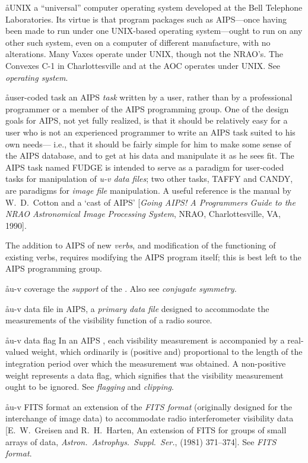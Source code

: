 \aa{UNIX}
a ``universal'' computer operating system developed at the Bell
Telephone Laboratories.  Its virtue is that program packages
such as AIPS---once having been made to run under one UNIX-based
operating system---ought to run on any other such system, even
on a computer of different manufacture, with no alterations.
Many Vaxes operate under UNIX, though not the NRAO's.
The Convexes C-1 in Charlottesville and at the AOC operates under
UNIX.
See {\it operating system}.

\aa{user-coded task}
an AIPS {\it task} written by a user, rather than by a professional
programmer or a member of the AIPS programming group.
One of the design goals for AIPS, not yet fully realized, is that
it should be relatively easy for a user
who is not an experienced programmer to write an AIPS task
suited to his own needs---%
i.e., that it should be fairly simple for him to make some
sense of the AIPS database, and to get at his data and manipulate
it as he sees fit.
The AIPS task named FUDGE is intended to serve as a paradigm
for user-coded tasks for manipulation of {\it u-v data files};
two other tasks, TAFFY and CANDY, are paradigms for
{\it image file} manipulation.
A useful reference is the manual by W.~D.~Cotton and a `cast of AIPS'
[{\it Going AIPS! A Programmers Guide to the NRAO Astronomical
Image Processing System}\/, NRAO, Charlottesville, VA, 1990].
\par
The addition to AIPS of new {\it verbs}\/,
and modification of the functioning of existing verbs,
requires modifying the AIPS program itself;
this is best left to the AIPS programming group.

\aa{u-v coverage}
the {\it support} of the  \qv.
Also see {\it conjugate symmetry.}

\aa{u-v data file}
in AIPS, a {\it primary data file} designed to accommodate  the measurements
of the visibility function of a radio source.

\aa{u-v data flag}
In an AIPS , each visibility measurement is accompanied
by a real-valued weight, which ordinarily is (positive and)
proportional to the length
of the integration period over which the measurement was obtained.
A non-positive weight represents a \uv data flag,
which signifies that the visibility measurement ought to be ignored.
See {\it flagging} and {\it clipping}.

\aa{u-v FITS format}
an extension of the {\it FITS format} (originally designed for the
interchange of image data)
to accommodate radio interferometer visibility data
[E.~W.~Greisen and R.~H.~Harten,
An extension of FITS for groups of small arrays of data,
{\it Astron.\ Astrophys.\ Suppl.\ Ser.},  (1981) 371--374].
See {\it FITS format}.

